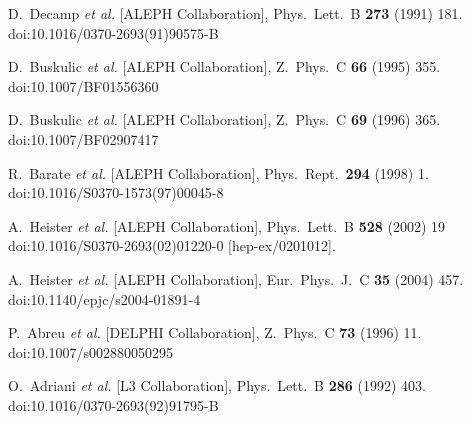 \documentclass[aps,preprint,floatfix,nofootinbib,showpacs]{revtex4-1}
\begin{document}
\clearpage 
\begin{thebibliography}{99}

  D.~Decamp {\it et al.} [ALEPH Collaboration],
  Phys.\ Lett.\ B {\bf 273} (1991) 181.
  doi:10.1016/0370-2693(91)90575-B
  
  D.~Buskulic {\it et al.} [ALEPH Collaboration],
  Z.\ Phys.\ C {\bf 66} (1995) 355.
  doi:10.1007/BF01556360
  
  D.~Buskulic {\it et al.} [ALEPH Collaboration],
  Z.\ Phys.\ C {\bf 69} (1996) 365.
  doi:10.1007/BF02907417
  
  R.~Barate {\it et al.} [ALEPH Collaboration],
  Phys.\ Rept.\  {\bf 294} (1998) 1.
  doi:10.1016/S0370-1573(97)00045-8
  
  A.~Heister {\it et al.} [ALEPH Collaboration],
  Phys.\ Lett.\ B {\bf 528} (2002) 19
  doi:10.1016/S0370-2693(02)01220-0
  [hep-ex/0201012].
  
  A.~Heister {\it et al.} [ALEPH Collaboration],
  Eur.\ Phys.\ J.\ C {\bf 35} (2004) 457.
  doi:10.1140/epjc/s2004-01891-4
  
  P.~Abreu {\it et al.} [DELPHI Collaboration],
  Z.\ Phys.\ C {\bf 73} (1996) 11.
  doi:10.1007/s002880050295
  

  O.~Adriani {\it et al.} [L3 Collaboration],
  Phys.\ Lett.\ B {\bf 286} (1992) 403.
  doi:10.1016/0370-2693(92)91795-B
  

\end{thebibliography}
\end{document}
